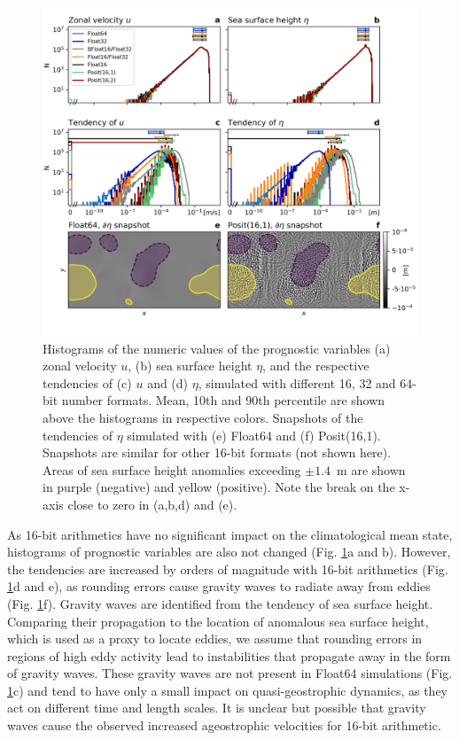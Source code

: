 \begin{figure}
\includegraphics[width=1\textwidth]{Figures/swm/tendency_hist2.png}
\caption{Histograms of the numeric values of the prognostic variables (a) zonal
velocity $u$, (b) sea surface height $\eta$, and the respective tendencies of
(c) $u$ and (d) $\eta$, simulated with different 16, 32
and 64-bit number formats. Mean, 10th and 90th percentile are shown above the
histograms in respective colors. Snapshots of the tendencies of $\eta$ simulated
with (e) Float64 and (f) Posit(16,1). Snapshots are similar for other 16-bit formats
(not shown here). Areas of sea surface height anomalies exceeding $\pm1.4$~m are
shown in purple (negative) and
yellow (positive). Note the break on the x-axis close to zero in (a,b,d) and (e).}
\label{fig:tend}
\end{figure}

As 16-bit arithmetics have no significant impact on the climatological mean state,
histograms of prognostic variables are also not changed (Fig. \ref{fig:tend}a and b).
However, the tendencies are increased by orders of magnitude with 16-bit arithmetics
(Fig. \ref{fig:tend}d and e), as rounding errors cause gravity waves to radiate
away from eddies (Fig. \ref{fig:tend}f). Gravity waves are identified from the
tendency of sea surface height. Comparing their propagation to the location of
anomalous sea surface height, which is used as a proxy to locate eddies, we
assume that rounding errors in regions of high eddy activity lead to instabilities
that propagate away in the form of gravity waves. These gravity waves are not
present in Float64 simulations (Fig. \ref{fig:tend}c) and tend to have only a
small impact on quasi-geostrophic dynamics, as they act on different time and
length scales. It is unclear but possible that gravity waves cause the observed
increased ageostrophic velocities for 16-bit arithmetic.

